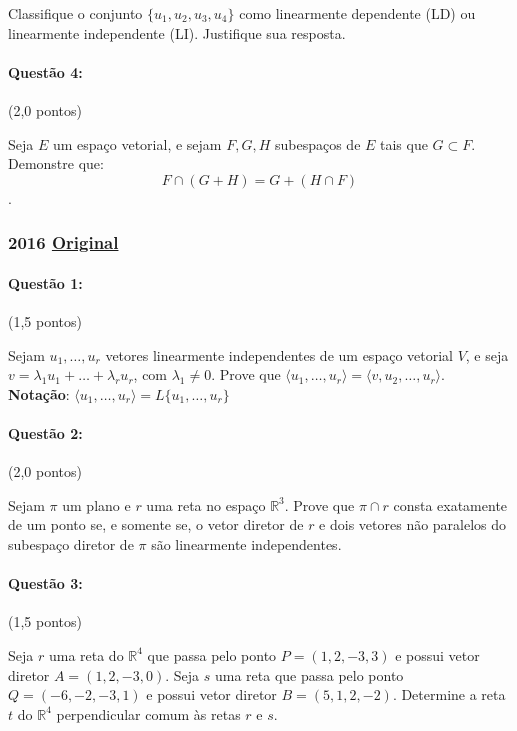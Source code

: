 \documentclass[12pt,a4paper]{article}
\newcommand{\original}[1]{\tiny \href{#1}{Original} \normalsize}
\begin{document}
Classifique o conjunto $\{u_1,u_2,u_3,u_4\}$ como linearmente dependente (LD) ou linearmente independente (LI). Justifique sua resposta.

\paragraph{Questão 4:} (2,0 pontos)

Seja $E$ um espaço vetorial, e sejam $F,G,H$ subespaços de $E$ tais que $G \subset F$. Demonstre que:
$$F \cap (G+H) = G + (H \cap F) $$.

\newpage
\subsubsection{2016 \original{https://drive.google.com/file/d/1udj9wCi2iZC4ZcMNgXBmm9L8D53rQsTK/view?usp=sharing}}

\paragraph{Questão 1:} (1,5 pontos)

Sejam $u_1,\dots,u_r$ vetores linearmente independentes de um espaço vetorial $V$, e seja $v=\lambda_1u_1+\dots+\lambda_ru_r$, com $\lambda_1 \neq 0$. Prove que $\langle u_1,\dots,u_r \rangle = \langle v,u_2,\dots,u_r \rangle$.
\\ 

\textbf{Notação}: $\langle u_1,\dots,u_r \rangle = L\{u_1,\dots,u_r\}$

\paragraph{Questão 2:} (2,0 pontos)

Sejam $\pi$ um plano e $r$ uma reta no espaço $\mathbb{R}^3$. Prove que $\pi\cap r$ consta exatamente de um ponto se, e somente se, o vetor diretor de $r$ e dois vetores não paralelos do subespaço diretor de $\pi$ são linearmente independentes.

\paragraph{Questão 3:} (1,5 pontos)

Seja $r$ uma reta do $\mathbb{R}^4$ que passa pelo ponto $P=(1,2,-3,3)$ e possui vetor diretor $A=(1,2,-3,0)$. Seja $s$ uma reta que passa pelo ponto $Q=(-6,-2,-3,1)$ e possui vetor diretor $B=(5,1,2,-2)$. Determine a reta $t$ do $\mathbb{R}^4$ perpendicular comum às retas $r$ e $s$.
\end{document}
